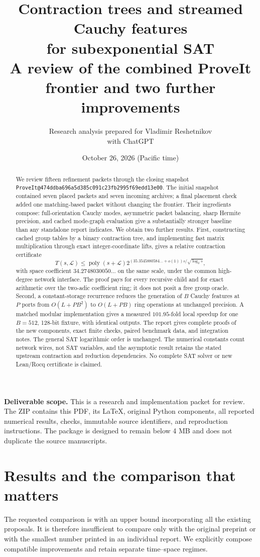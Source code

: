 \documentclass[11pt,letterpaper]{article}
\title{Contraction trees and streamed Cauchy features\\for subexponential SAT\\[5pt]\large A review of the combined ProveIt frontier and two further improvements}
\author{Research analysis prepared for Vladimir Reshetnikov\\\small with ChatGPT}
\date{October 26, 2026 (Pacific time)}
\theoremstyle{definition}\newtheorem{definition}[theorem]{Definition}
\theoremstyle{remark}\newtheorem{remark}[theorem]{Remark}
\newcommand{\poly}{\operatorname{poly}}
\begin{document}
\maketitle
\begin{abstract}
We review fifteen refinement packets through the closing snapshot
\nolinkurl{ProveIt@474ddba696a5d385c091c23fb2995f69edd13e00}.
The initial snapshot contained seven placed packets and seven incoming archives; a final
placement check added one matching-based packet without changing the frontier.
Their ingredients compose: full-orientation Cauchy modes, asymmetric packet balancing,
sharp Hermite precision, and cached mode-graph evaluation give a substantially stronger
baseline than any standalone report indicates. We obtain two further results.
First, constructing cached group tables by a binary contraction tree, and implementing
fast matrix multiplication through exact integer-coordinate lifts, gives a relative
contraction certificate
\[
 T(s,\mathcal L)\le\poly(s+\mathcal L)
 2^{(35.3545880584\ldots+o(1))s/\sqrt{\log_2s}},
\]
with space coefficient $34.2748030050\ldots$ on the same scale, under the common
high-degree network interface. The proof pays for every recursive child and for exact
arithmetic over the two-adic coefficient ring; it does not posit a free group oracle.
Second, a constant-storage recurrence reduces the generation of $B$ Cauchy features
at $P$ ports from $O(L+PB^2)$ to $O(L+PB)$ ring operations at unchanged precision.
A matched modular implementation gives a measured $101.95$-fold local speedup for
one $B=512$, 128-bit fixture, with identical outputs. The report gives complete proofs
of the new components, exact finite checks, paired benchmark data, and integration notes.
The general SAT logarithmic order is unchanged. The numerical constants count network
wires, not SAT variables, and the asymptotic result retains the stated upstream
contraction and reduction dependencies. No complete SAT solver or new Lean/Rocq
certificate is claimed.
\end{abstract}
\noindent\textbf{Deliverable scope.} This is a research and implementation packet for review.
The ZIP contains this PDF, its LaTeX, original Python components, all reported numerical
results, checks, immutable source identifiers, and reproduction instructions. The package
is designed to remain below 4 MB and does not duplicate the source manuscripts.
\newpage
\tableofcontents
\newpage

\section{Results and the comparison that matters}
\label{sec:results}
The requested comparison is with an upper bound incorporating all the existing proposals.
It is therefore insufficient to compare only with the original preprint or with the
smallest number printed in an individual report. We explicitly compose compatible
improvements and retain separate time--space regimes.
\end{document}
